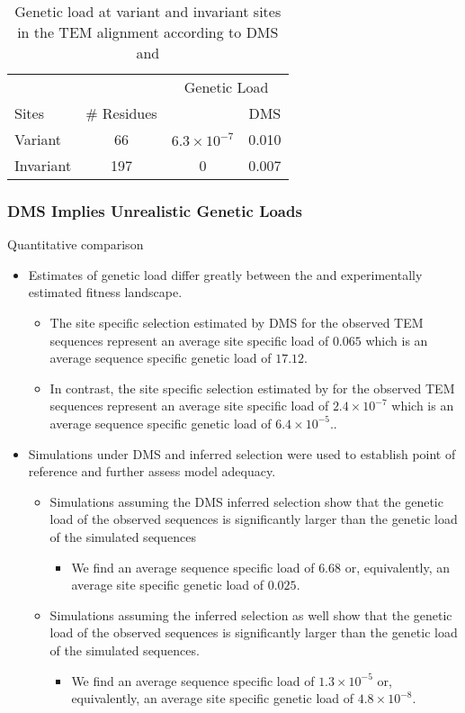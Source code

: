 \documentclass[12pt]{article}
\begin{document}
\begin{table}[h]
  \centering
  \caption{Genetic load at variant and invariant sites in the TEM alignment according to DMS and \selac}
  \begin{tabular}{lccc}
    \hline
			& 		& \multicolumn{2}{c}{Genetic Load}  \\ 
    Sites 		& \# Residues	& \multicolumn{1}{c}{\selac} & \multicolumn{1}{c}{DMS} \\ \hline 
    Variant	&	66	& $6.3\times10^{-7}$ & 0.010  \\
    Invariant		& 	197	& 0 & 0.007 \\
  \end{tabular}
  \label{tab:selection}
\end{table}

\subsubsection*{DMS Implies Unrealistic Genetic Loads}
Quantitative comparison
\begin{itemize}
	\item Estimates of genetic load differ greatly between the \selac and experimentally estimated fitness landscape.
	\begin{itemize}
		\item The site specific selection estimated by DMS for the observed TEM sequences represent an average site specific load of $0.065$ which is an average sequence specific genetic load of $17.12$.
		\item In contrast, the site specific selection estimated by \selac for the observed TEM sequences represent an average site specific load of $2.4\times10^{-7}$ which is an average sequence specific genetic load of $6.4\times10^{-5}$..
	\end{itemize}
	\item Simulations under DMS and \selac inferred selection were used to establish point of reference and further assess model adequacy.
	\begin{itemize}
		\item Simulations assuming the DMS inferred selection show that the genetic load of the observed sequences is significantly larger than the genetic load of the simulated sequences
		\begin{itemize}
			\item We find an average sequence specific load of $6.68$ or, equivalently, an average site specific genetic load of $0.025$.
		\end{itemize}
		\item Simulations assuming the \selac inferred selection as well show that the genetic load of the observed sequences is significantly larger than the genetic load of the simulated sequences.
		\begin{itemize}
			\item We find an average sequence specific load of $1.3\times10^{-5}$ or, equivalently, an average site specific genetic load of $4.8\times 10^{-8}$.
		\end{itemize}
	\end{itemize}
\end{itemize}
\end{document}
